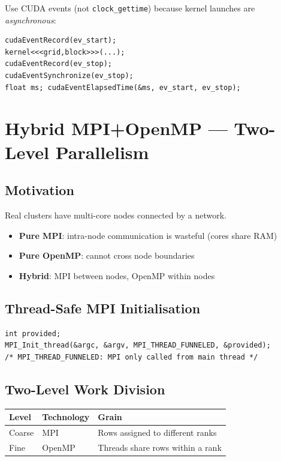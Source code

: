 \documentclass[12pt,a4paper]{report}
\begin{document}
Use CUDA events (not \texttt{clock\_gettime}) because kernel launches are
\emph{asynchronous}:
\begin{lstlisting}
cudaEventRecord(ev_start);
kernel<<<grid,block>>>(...);
cudaEventRecord(ev_stop);
cudaEventSynchronize(ev_stop);
float ms; cudaEventElapsedTime(&ms, ev_start, ev_stop);
\end{lstlisting}

\chapter{Hybrid MPI+OpenMP — Two-Level Parallelism}

\section{Motivation}

Real clusters have multi-core nodes connected by a network.
\begin{itemize}
    \item \textbf{Pure MPI}: intra-node communication is wasteful (cores share RAM)
    \item \textbf{Pure OpenMP}: cannot cross node boundaries
    \item \textbf{Hybrid}: MPI between nodes, OpenMP within nodes
\end{itemize}

\section{Thread-Safe MPI Initialisation}

\begin{lstlisting}
int provided;
MPI_Init_thread(&argc, &argv, MPI_THREAD_FUNNELED, &provided);
/* MPI_THREAD_FUNNELED: MPI only called from main thread */
\end{lstlisting}

\section{Two-Level Work Division}

\begin{center}
\begin{tabular}{lll}
\toprule
Level & Technology & Grain \\
\midrule
Coarse & MPI & Rows assigned to different ranks \\
Fine & OpenMP & Threads share rows within a rank \\
\bottomrule
\end{tabular}
\end{center}
\end{document}
